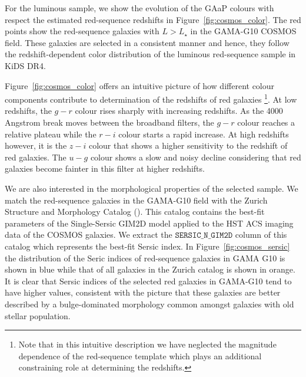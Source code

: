 \documentclass[fleqn,usenatbib,useAMS]{mnras}
\begin{document}
For the luminous sample, we show the evolution of the GAaP colours with respect the estimated red-sequence redshifts in Figure~\ref{fig:cosmos_color}. The red points show the red-sequence galaxies with $L>L_{\star}$ in the GAMA-G10 COSMOS field. These galaxies are selected in a consistent manner and hence, they follow the redshift-dependent color distribution of the luminous red-sequence sample in KiDS DR4. 

Figure~\ref{fig:cosmos_color} offers an intuitive picture of how different colour components contribute to determination of the redshifts of red galaxies \footnote{Note that in this intuitive description we have neglected the magnitude dependence of the red-sequence template which plays an additional constraining role at determining the redshifts.}. At low redshifts, the $g-r$ colour rises sharply with increasing redshifts. As the 4000 Angstrom break moves between the broadband filters, the $g-r$ colour reaches a relative plateau while the $r-i$ colour starts a rapid increase. At high redshifts however, it is the $z-i$ colour that shows a higher sensitivity to the redshift of red galaxies. The $u-g$ colour shows a slow and noisy decline considering that red galaxies become fainter in this filter at higher redshifts. 




We are also interested in the morphological properties of the selected sample. We match the red-sequence galaxies in the GAMA-G10 field with the Zurich Structure and Morphology Catalog (\citealt{scarlata2007, sargent2007}). This catalog contains the best-fit parameters of the Single-Sersic GIM2D model applied to the HST ACS imaging data of the COSMOS galaxies. We extract the $\mathtt{SERSIC\_N\_GIM2D}$ column of this catalog which represents the best-fit Sersic index. In Figure~\ref{fig:cosmos_sersic} the distribution of the Seric indices of red-sequence galaxies in GAMA G10 is shown in blue while that of all galaxies in the Zurich catalog is shown in orange. It is clear that Sersic indices of the selected red galaxies in GAMA-G10 tend to have higher values, consistent with the picture that these galaxies are better described by a bulge-dominated morphology common amongst galaxies with old stellar population.
\end{document}
